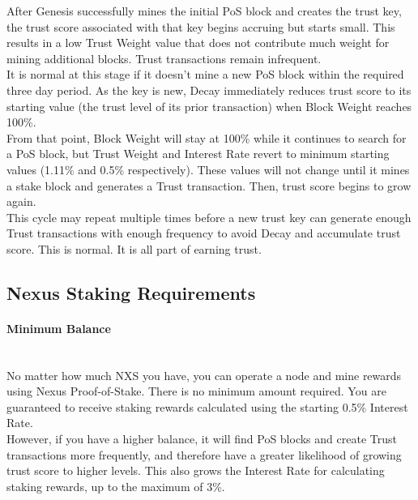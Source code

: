 \documentclass[11pt]{article}
\begin{document}
\noindent After Genesis successfully mines the initial PoS block and creates the trust key, the trust score associated with that key begins accruing but starts small. This results in a low Trust Weight value that does not contribute much weight for mining additional blocks. Trust transactions remain infrequent. \\

\noindent It is normal at this stage if it doesn't mine a new PoS block within the required three day period. As the key is new, Decay immediately reduces trust score to its starting value (the trust level of its prior transaction) when Block Weight reaches 100\%.\\ 

\noindent From that point, Block Weight will stay at 100\% while it continues to search for a PoS block, but Trust Weight and Interest Rate revert to minimum starting values (1.11\% and 0.5\% respectively). These values will not change until it mines a stake block and generates a Trust transaction. Then, trust score begins to grow again.\\

\noindent This cycle may repeat multiple times before a new trust key can generate enough Trust transactions with enough frequency to avoid Decay and accumulate trust score. This is normal. It is all part of earning trust.\\

\subsection{Nexus Staking Requirements}

\paragraph{Minimum Balance} ~\\
No matter how much NXS you have, you can operate a node and mine rewards using Nexus Proof-of-Stake. There is no minimum amount required. You are guaranteed to receive staking rewards calculated using the starting 0.5\% Interest Rate. \\

\noindent However, if you have a higher balance, it will find PoS blocks and create Trust transactions more frequently, and therefore have a greater likelihood of growing trust score to higher levels. This also grows the Interest Rate for calculating staking rewards, up to the maximum of 3\%.
\end{document}
